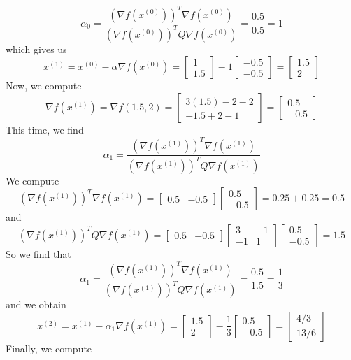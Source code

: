 \documentclass[12pt]{article}
\begin{document}
\[
\alpha_0 = \frac{(\nabla f(x^{(0)}))^T \nabla f(x^{(0)})}{(\nabla f(x^{(0)}))^TQ \nabla f(x^{(0)})} = \frac{0.5}{0.5} = 1
\] which gives us
\[
x^{(1)} = x^{(0)} - \alpha \nabla f(x^{(0)})  = \begin{bmatrix}
1\\
1.5
\end{bmatrix} - 1 \begin{bmatrix}
-0.5 \\ -0.5
\end{bmatrix} =
\begin{bmatrix}
1.5\\
2
\end{bmatrix}
\] Now, we compute
\[
\nabla f(x^{(1)}) = \nabla f(1.5,2) = \begin{bmatrix}
3(1.5) - 2 - 2\\
-1.5 + 2 - 1
\end{bmatrix} = 
\begin{bmatrix}
0.5 \\
-0.5
\end{bmatrix}
\] This time, we find
\[
\alpha_1 = \frac{(\nabla f(x^{(1)}))^T \nabla f(x^{(1)})}{(\nabla f(x^{(1)}))^TQ \nabla f(x^{(1)})} 
\] We compute
\[
(\nabla f(x^{(1)}))^T \nabla f(x^{(1)}) = \begin{bmatrix}
0.5 & -0.5
\end{bmatrix} \begin{bmatrix}
0.5 \\
-0.5
\end{bmatrix} = 0.25 + 0.25 = 0.5
\] and
\[
(\nabla f(x^{(1)}))^TQ \nabla f(x^{(1)}) =
\begin{bmatrix}
0.5 & -0.5
\end{bmatrix}
\begin{bmatrix}
3 & -1\\
-1 & 1
\end{bmatrix}
 \begin{bmatrix}
0.5 \\
-0.5
\end{bmatrix} = 1.5
\] So we find that
\[
\alpha_1 = \frac{(\nabla f(x^{(1)}))^T \nabla f(x^{(1)})}{(\nabla f(x^{(1)}))^TQ \nabla f(x^{(1)})}  = \frac{0.5}{1.5} = \frac{1}{3}
\] and we obtain
\[
x^{(2)} = x^{(1)} - \alpha_1 \nabla f(x^{(1)}) = \begin{bmatrix}
1.5\\
2
\end{bmatrix} - \frac{1}{3} \begin{bmatrix}
0.5 \\
-0.5
\end{bmatrix} = \begin{bmatrix}
4/3\\
13/6
\end{bmatrix}
\] Finally, we compute
\end{document}
